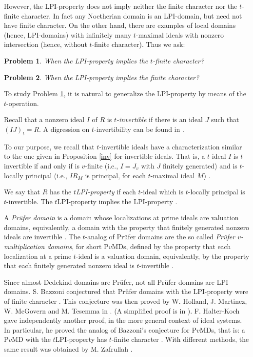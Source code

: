 \documentclass[12pt]{amsart}
\newtheorem{Qu}{Problem}
\theoremstyle{definition}
\begin{document}
However,  the LPI-property does not imply neither the finite character nor the $t$-finite character. In fact any Noetherian domain is an LPI-domain, but need not have finite character.  On the other hand,  there are examples of local domains (hence, LPI-domains) with infinitely many $t$-maximal ideals with nonzero intersection (hence, without $t$-finite character)\cite[Example 1.13]{FPT}.
Thus we ask:

\begin{Qu} \label{Qt} When the  LPI-property implies the $t$-finite character?
\end{Qu}

\begin{Qu} \label{Q2} When the  LPI-property implies the finite character? \end{Qu}

To study Problem \ref{Qt}, it is natural to  generalize the LPI-property by means of the $t$-operation.

Recall that a nonzero ideal $I$ of $R$ is \emph{$t$-invertible} if there is an ideal $J$ such that $(IJ)_t=R$. A digression on $t$-invertibility can be found in \cite{Z}.

To our purpose, we recall that $t$-invertible ideals have a characterization similar to the one given in Proposition \ref{inv} for invertible ideals. That is, a $t$-ideal $I$ is $t$-invertible if and only if is $v$-finite (i.e., $I=J_v$ with $J$ finitely generated) and is $t$-locally principal (i.e., $IR_M$ is principal, for each $t$-maximal ideal $M$) \cite[Theorems 1.1 and 2.2]{Z}. 

We say that $R$ has the  \emph{$t$LPI-property} if each $t$-ideal which is $t$-locally principal is $t$-invertible. 
 The $t$LPI-property implies the LPI-property \cite[Proposition 2.2]{FPT}.
 
A \emph{Pr\"ufer domain} is a domain whose localizations at prime ideals are valuation domains, equivalently, a domain with the property that finitely generated  nonzero ideals are invertible \cite[Chapter IV]{gilmer}. The $t$-analog of Pr\"ufer domains are the so called \emph{Pr\"ufer $v$-multiplication domains}, for short P$v$MDs, defined by the property that each localization at a prime $t$-ideal is a valuation domain, equivalently, by the property that each finitely generated nonzero  ideal is $t$-invertible \cite{MZ}.

Since almost Dedekind domains are Pr\"ufer, not all Pr\"ufer domains are LPI-domains. S. Bazzoni conjectured that Pr\"ufer domains with the LPI-property were of finite character \cite[p. 630]{B1}. 
This conjecture was then proved by W. Holland, J. Martinez, W. McGovern and M. Tesemma in \cite{HM}. (A simplified proof is in \cite{McG}). F. Halter-Koch gave independently another proof, in the more general context of  ideal systems. In particular, he proved the analog of Bazzoni's conjecture for P$v$MDs, that is: a P$v$MD with the $t$LPI-property has $t$-finite character  \cite[Theorem 6.11]{HK}. With different methods, the same result was obtained by M. Zafrullah  \cite[Proposition 5]{Za}.
\end{document}
